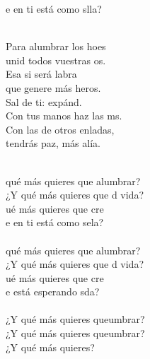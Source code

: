\documentclass[12pt]{article}
\begin{document}
\begin{multicols}{2}
\begin{cancion}
\begin{chorus}
            e en ti está como slla?\\
            \end{chorus}%
            \jump\\
            Para alumbrar los hoes \\
            unid todos vuestras os.\\
            Esa si será labra\\
            que genere más heros.\\
            Sal de ti: expánd. \\
            Con tus manos haz las ms.\\
            Con las de otros enladas,\\
            tendrás paz, más alía.\\\jump\\
            \begin{chorus}%
             qué más quieres que alumbrar?\\
            ¿Y qué más quieres que d vida?\\
            ué más quieres que cre \\
            e en ti está como sela?\\
        \jump\\
             qué más quieres que alumbrar?\\
            ¿Y qué más quieres que d vida?\\
            ué más quieres que cre \\
            e está esperando sda?\\
        \jump\\
            ¿Y qué más quieres queumbrar?\\
            ¿Y qué más quieres queumbrar?\\
        ¿Y qué más quieres?\\
            \end{chorus}%
            \jump\\
        \end{cancion}%
        

\end{multicols}
    
\end{document}
